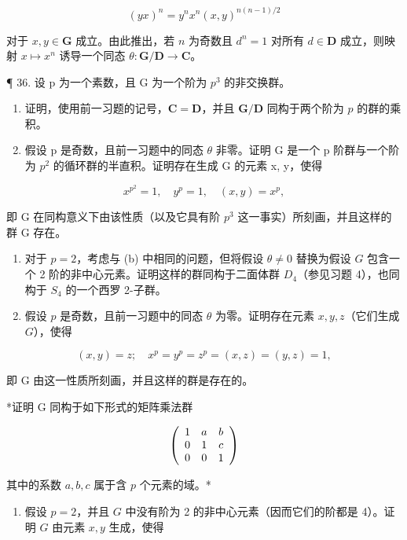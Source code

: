 \[
(y x) ^ {n} = y ^ {n} x ^ {n} (x, y) ^ {n (n - 1) / 2}
\]

对于 \(x, y \in \mathbf{G}\) 成立。由此推出，若 \(n\) 为奇数且 \(d^n = 1\) 对所有 \(d \in \mathbf{D}\) 成立，则映射 \(x \mapsto x^n\) 诱导一个同态 \(\theta: \mathbf{G} / \mathbf{D} \to \mathbf{C}\)。

¶ 36. 设 p 为一个素数，且 G 为一个阶为 \(p^{3}\) 的非交换群。

\begin{enumerate}
\def\labelenumi{(\alph{enumi})}
\item
  证明，使用前一习题的记号，\(\mathbf{C} = \mathbf{D}\)，并且 \(\mathbf{G} / \mathbf{D}\) 同构于两个阶为 \(p\) 的群的乘积。
\item
  假设 p 是奇数，且前一习题中的同态 \(\theta\) 非零。证明 G 是一个 p 阶群与一个阶为 \(p^{2}\) 的循环群的半直积。证明存在生成 G 的元素 x, y，使得
\end{enumerate}

\[
x ^ {p ^ {2}} = 1, \quad y ^ {p} = 1, \quad (x, y) = x ^ {p},
\]

即 G 在同构意义下由该性质（以及它具有阶 \(p^{3}\) 这一事实）所刻画，并且这样的群 G 存在。

\begin{enumerate}
\def\labelenumi{(\alph{enumi})}
\setcounter{enumi}{2}
\item
  对于 \(p = 2\)，考虑与 (b) 中相同的问题，但将假设 \(\theta \neq 0\) 替换为假设 \(G\) 包含一个 2 阶的非中心元素。证明这样的群同构于二面体群 \(D_4\)（参见习题 4），也同构于 \(S_4\) 的一个西罗 2-子群。
\item
  假设 \(p\) 是奇数，且前一习题中的同态 \(\theta\) 为零。证明存在元素 \(x, y, z\)（它们生成 \(G\)），使得
\end{enumerate}

\[
(x, y) = z; \quad x ^ {p} = y ^ {p} = z ^ {p} = (x, z) = (y, z) = 1,
\]

即 G 由这一性质所刻画，并且这样的群是存在的。

*证明 G 同构于如下形式的矩阵乘法群

\[
\left( \begin{array}{c c c} 1 & a & b \\ 0 & 1 & c \\ 0 & 0 & 1 \end{array} \right)
\]

其中的系数 \(a, b, c\) 属于含 \(p\) 个元素的域。*

\begin{enumerate}
\def\labelenumi{(\alph{enumi})}
\setcounter{enumi}{4}
\tightlist
\item
  假设 \(p = 2\)，并且 \(G\) 中没有阶为 2 的非中心元素（因而它们的阶都是 4）。证明 \(G\) 由元素 \(x, y\) 生成，使得
\end{enumerate}

